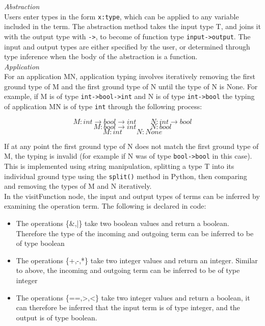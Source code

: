 \documentclass[a4paper,12pt]{report}
\begin{document}
\textit{Abstraction}\\
Users enter types in the form \texttt{x:type}, which can be applied to any variable included in the term. The abstraction method takes the input type T, and joins it with the output type with \texttt{->}, to become of function type \texttt{input->output}. The input and output types are either specified by the user, or determined through type inference when the body of the abstraction is a function.\\

\textit{Application}\\
For an application MN, application typing involves iteratively removing the first ground type of M and the first ground type of N until the type of N is None. For example, if M is of type \texttt{int->bool->int} and N is of type \texttt{int->bool} the typing of application MN is of type \texttt{int} through the following process:

\begin{equation*}
M:int\rightarrow bool\rightarrow int \qquad N:int\rightarrow bool
\end{equation*}
\begin{equation*}
M:bool\rightarrow int \qquad N:bool
\end{equation*}
\begin{equation*}
M:int \qquad N:None
\end{equation*}

If at any point the first ground type of N does not match the first ground type of M, the typing is invalid (for example if N was of type \texttt{bool->bool} in this case). This is implemented using string manipulation, splitting a type T into its individual ground type using the \texttt{split()} method in Python, then comparing and removing the types of M and N iteratively.\\

In the visitFunction node, the input and output types of terms can be inferred by examining the operation term. The following is declared in code:

\begin{itemize}
	\item The operations \{\&,|\} take two boolean values and return a boolean. Therefore the type of the incoming and outgoing term can be inferred to be of type boolean
	\item The operations \{+,-,*\} take two integer values and return an integer. Similar to above, the incoming and outgoing term can be inferred to be of type integer
	\item The operations \{==,>,<\} take two integer values and return a boolean, it can therefore be inferred that the input term is of type integer, and the output is of type boolean. 
\end{itemize}
\end{document}
